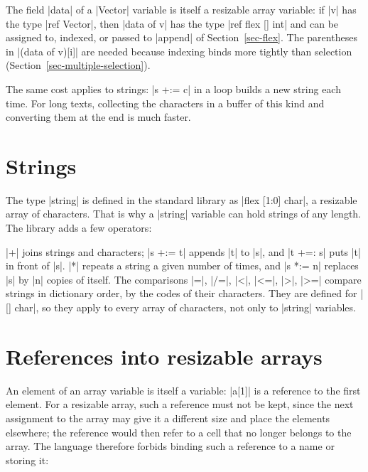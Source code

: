 The field \code|data| of a \code|Vector| variable is itself a resizable
array variable: if \code|v| has the type \code|ref Vector|, then
\code|data of v| has the type \code|ref flex [] int| and can be assigned
to, indexed, or passed to \code|append| of Section~\ref{sec-flex}. The
parentheses in \code|(data of v)[i]| are needed because indexing binds
more tightly than selection (Section~\ref{sec-multiple-selection}).

The same cost applies to strings: \code|s +:= c| in a loop builds a new
string each time. For long texts, collecting the characters in a buffer
of this kind and converting them at the end is much faster.

\section{Strings}\label{sec-string}

The type \code|string| is defined in the standard library as
\code|flex [1:0] char|, a resizable array of characters. That is why a
\code|string| variable can hold strings of any length. The library adds a
few operators:


\code|+| joins strings and characters; \code|s +:= t| appends \code|t|
to \code|s|, and \code|t +=: s| puts \code|t| in front of \code|s|.
\code|*| repeats a string a given number of times, and \code|s *:= n|
replaces \code|s| by \code|n| copies of itself. The comparisons
\code|=|, \code|/=|, \code|<|, \code|<=|, \code|>|, \code|>=| compare
strings in dictionary order, by the codes of their characters. They are
defined for \code|[] char|, so they apply to every array of characters,
not only to \code|string| variables.

\section{References into resizable arrays}\label{sec-transient}

An element of an array variable is itself a variable: \code|a[1]| is a
reference to the first element. For a resizable array, such a reference
must not be kept, since the next assignment to the array may give it a
different size and place the elements elsewhere; the reference would then
refer to a cell that no longer belongs to the array. The language
therefore forbids binding such a reference to a name or storing it:


